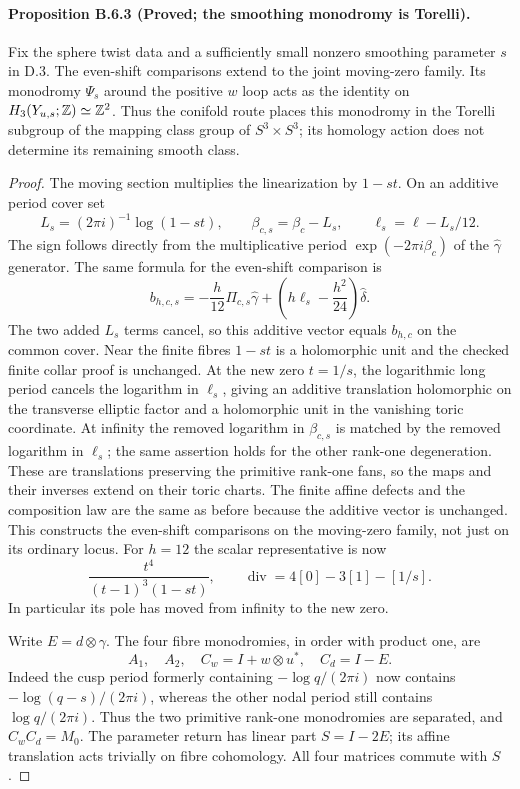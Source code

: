 \paragraph{Proposition B.6.3 (Proved; the smoothing monodromy is Torelli).}
Fix the sphere twist data and a sufficiently small nonzero smoothing
parameter $s$ in D.3. The even-shift comparisons extend to the joint
moving-zero family. Its monodromy $\Psi_s$ around the positive $w$
loop acts as the identity on $H_3(Y_{u,s};\mathbb Z)\simeq\mathbb Z^2$.
Thus the conifold route places this monodromy in the Torelli subgroup
of the mapping class group of $S^3\times S^3$; its homology action
does not determine its remaining smooth class.
\begin{proof}
The moving section multiplies the linearization by $1-st$. On an
additive period cover set
\[
 L_s=(2\pi i)^{-1}\log(1-st),\qquad
 \beta_{c,s}=\beta_c-L_s,\qquad
 \ell_s=\ell-L_s/12.
\]
The sign follows directly from the multiplicative period
$\exp(-2\pi i\beta_c)$ of the $\widehat\gamma$ generator.
The same formula for the even-shift comparison is
\[
 b_{h,c,s}=-\frac h{12}\Pi_{c,s}\widehat\gamma+
             \left(h\ell_s-\frac{h^2}{24}\right)\widehat\delta.
\]
The two added $L_s$ terms cancel, so this additive vector equals
$b_{h,c}$ on the common cover. Near the finite fibres $1-st$ is a
holomorphic unit and the checked finite collar proof is unchanged.
At the new zero $t=1/s$, the logarithmic long period cancels the
logarithm in $\ell_s$, giving an additive translation holomorphic
on the transverse elliptic factor and a holomorphic unit in the
vanishing toric coordinate. At infinity the removed logarithm in
$\beta_{c,s}$ is matched by the removed logarithm in $\ell_s$;
the same assertion holds for the other rank-one degeneration.
These are translations preserving the primitive rank-one fans, so
the maps and their inverses extend on their toric charts. The finite
affine defects and the composition law are the same as before because
the additive vector is unchanged. This constructs the even-shift
comparisons on the moving-zero family, not just on its ordinary locus.
For $h=12$ the scalar representative is now
\[
 \frac{t^4}{(t-1)^3(1-st)},
 \qquad \operatorname{div}=4[0]-3[1]-[1/s].
 \tag{B.6.1}
\]
In particular its pole has moved from infinity to the new zero.

Write $E=d\otimes\gamma$. The four fibre monodromies, in order
with product one, are
\[
 A_1,\quad A_2,\quad C_w=I+w\otimes u^*,\quad C_d=I-E.
 \tag{B.6.2}
\]
Indeed the cusp period formerly containing $-\log q/(2\pi i)$
now contains $-\log(q-s)/(2\pi i)$, whereas the other nodal period
still contains $\log q/(2\pi i)$. Thus the two primitive rank-one
monodromies are separated, and $C_wC_d=M_0$. The parameter return
has linear part $S=I-2E$; its affine translation acts trivially on
fibre cohomology. All four matrices commute with $S$.


\end{proof}
